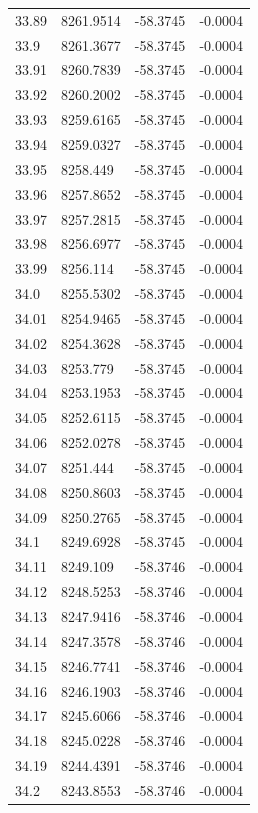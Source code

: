 \begin{table}[H]
\begin{tabular}{llll}
33.89 & 8261.9514 & -58.3745 & -0.0004 \\
33.9 & 8261.3677 & -58.3745 & -0.0004 \\
33.91 & 8260.7839 & -58.3745 & -0.0004 \\
33.92 & 8260.2002 & -58.3745 & -0.0004 \\
33.93 & 8259.6165 & -58.3745 & -0.0004 \\
33.94 & 8259.0327 & -58.3745 & -0.0004 \\
33.95 & 8258.449 & -58.3745 & -0.0004 \\
33.96 & 8257.8652 & -58.3745 & -0.0004 \\
33.97 & 8257.2815 & -58.3745 & -0.0004 \\
33.98 & 8256.6977 & -58.3745 & -0.0004 \\
33.99 & 8256.114 & -58.3745 & -0.0004 \\
34.0 & 8255.5302 & -58.3745 & -0.0004 \\
34.01 & 8254.9465 & -58.3745 & -0.0004 \\
34.02 & 8254.3628 & -58.3745 & -0.0004 \\
34.03 & 8253.779 & -58.3745 & -0.0004 \\
34.04 & 8253.1953 & -58.3745 & -0.0004 \\
34.05 & 8252.6115 & -58.3745 & -0.0004 \\
34.06 & 8252.0278 & -58.3745 & -0.0004 \\
34.07 & 8251.444 & -58.3745 & -0.0004 \\
34.08 & 8250.8603 & -58.3745 & -0.0004 \\
34.09 & 8250.2765 & -58.3745 & -0.0004 \\
34.1 & 8249.6928 & -58.3745 & -0.0004 \\
34.11 & 8249.109 & -58.3746 & -0.0004 \\
34.12 & 8248.5253 & -58.3746 & -0.0004 \\
34.13 & 8247.9416 & -58.3746 & -0.0004 \\
34.14 & 8247.3578 & -58.3746 & -0.0004 \\
34.15 & 8246.7741 & -58.3746 & -0.0004 \\
34.16 & 8246.1903 & -58.3746 & -0.0004 \\
34.17 & 8245.6066 & -58.3746 & -0.0004 \\
34.18 & 8245.0228 & -58.3746 & -0.0004 \\
34.19 & 8244.4391 & -58.3746 & -0.0004 \\
34.2 & 8243.8553 & -58.3746 & -0.0004 \\

\end{tabular}
\end{table}
